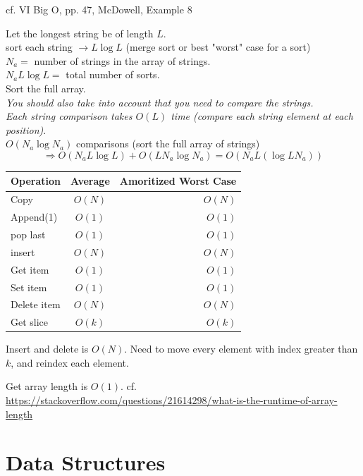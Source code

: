 \documentclass[10pt]{amsart}
\begin{document}
cf. VI Big O, pp. 47, McDowell, Example 8

Let the longest string be of length $L$. \\
sort each string $\to L\log{L}$ (merge sort or best "worst" case for a sort) \\
$N_a= $ number of strings in the array of strings. \\
$N_a L \log{L} = $ total number of sorts. \\

Sort the full array.\\
\emph{You should also take into account that you need to compare the strings.} \\
\emph{Each string comparison takes $O(L)$ time (compare each string element at each position)}. \\
$O(N_a \log{N_a})$ comparisons (sort the full array of strings) \\

\[
\Longrightarrow \boxed{ O(N_a L \log{L}) + O(L N_a \log{N_a}) = O(N_aL (\log{LN_a})) }
\]

\begin{center}
	\begin{tabular}{ l | c | r }
		\hline
		Operation & Average & Amoritized Worst Case \\ \hline
		Copy & $O(N)$ & $O(N)$ \\ \hline
		Append(1) & $O(1)$ & $O(1)$ \\ \hline
		pop last & $O(1)$ & $O(1)$ \\ \hline
		insert & $O(N)$ & $O(N)$ \\ \hline
		Get item & $O(1)$ & $O(1)$ \\ \hline
		Set item & $O(1)$ & $O(1)$ \\ \hline
		Delete item & $O(N)$ & $O(N)$ \\ \hline
		Get slice & $O(k)$ & $O(k)$ \\ \hline		
		\hline
	\end{tabular}
\end{center}

Insert and delete is $O(N)$. Need to move every element with index greater than $k$, and reindex each element.

Get array length is $O(1)$. cf. \url{https://stackoverflow.com/questions/21614298/what-is-the-runtime-of-array-length} 

\section{Data Structures}
\end{document}
